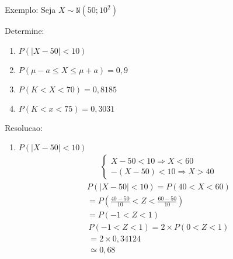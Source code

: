 \begin{description}
\begin{description}
\begin{enumerate}[label=(\alph*)]
      \end{enumerate}
    \item {Exemplo:} Seja $X \sim \mathtt{N}(50; 10^2)$
      \begin{description}
        \item {Determine:}
          \begin{enumerate}[label=(\alph*)]
   \item $P(|X-50| <10)$
  \item $P( \mu-a \leq X \leq \mu +a )=0,9$
  \item $P(K< X <70)=0,8185$
  \item $P(K < x <75)= 0,3031$
          \end{enumerate}
        \item {Resolucao:}
\begin{enumerate}[label=(\alph*)]
   \item $P(|X-50| <10)$
     \begin{align*}
       \begin{cases}
        X-50<10 \Rightarrow X<60 \\
        -(X-50) <10 \Rightarrow X>40
       \end{cases}
     \end{align*}
     \begin{align*}
       P(|X-50| <10)  = P(40<X<60) \\
   = P(\frac{40-50}{10}< Z < \frac{60-50}{10}) \\
   = P(-1 < Z < 1)
 \end{align*} 
\begin{align*}
  P(-1 < Z <1)  = 2 \times P(0 < Z <1) \\
  = 2 \times 0,34124 \\
  \simeq 0,68
\end{align*}


\end{enumerate}
\end{description}
\end{description}
\end{description}

